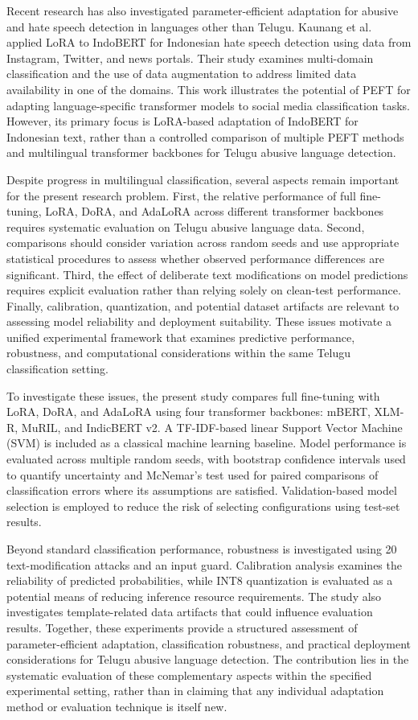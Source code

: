 \documentclass{svproc}
\begin{document}
Recent research has also investigated parameter-efficient adaptation for abusive and hate speech detection in languages other than Telugu. Kaunang et al.~\cite{kaunang2026indo} applied LoRA to IndoBERT for Indonesian hate speech detection using data from Instagram, Twitter, and news portals. Their study examines multi-domain classification and the use of data augmentation to address limited data availability in one of the domains. This work illustrates the potential of PEFT for adapting language-specific transformer models to social media classification tasks. However, its primary focus is LoRA-based adaptation of IndoBERT for Indonesian text, rather than a controlled comparison of multiple PEFT methods and multilingual transformer backbones for Telugu abusive language detection.

Despite progress in multilingual classification, several aspects remain important for the present research problem. First, the relative performance of full fine-tuning, LoRA, DoRA, and AdaLoRA across different transformer backbones requires systematic evaluation on Telugu abusive language data. Second, comparisons should consider variation across random seeds and use appropriate statistical procedures to assess whether observed performance differences are significant. Third, the effect of deliberate text modifications on model predictions requires explicit evaluation rather than relying solely on clean-test performance. Finally, calibration, quantization, and potential dataset artifacts are relevant to assessing model reliability and deployment suitability. These issues motivate a unified experimental framework that examines predictive performance, robustness, and computational considerations within the same Telugu classification setting.

To investigate these issues, the present study compares full fine-tuning with LoRA, DoRA, and AdaLoRA using four transformer backbones: mBERT, XLM-R, MuRIL, and IndicBERT v2. A TF-IDF-based linear Support Vector Machine (SVM) is included as a classical machine learning baseline. Model performance is evaluated across multiple random seeds, with bootstrap confidence intervals used to quantify uncertainty and McNemar's test used for paired comparisons of classification errors where its assumptions are satisfied. Validation-based model selection is employed to reduce the risk of selecting configurations using test-set results.

Beyond standard classification performance, robustness is investigated using 20 text-modification attacks and an input guard. Calibration analysis examines the reliability of predicted probabilities, while INT8 quantization is evaluated as a potential means of reducing inference resource requirements. The study also investigates template-related data artifacts that could influence evaluation results. Together, these experiments provide a structured assessment of parameter-efficient adaptation, classification robustness, and practical deployment considerations for Telugu abusive language detection. The contribution lies in the systematic evaluation of these complementary aspects within the specified experimental setting, rather than in claiming that any individual adaptation method or evaluation technique is itself new.
\end{document}
